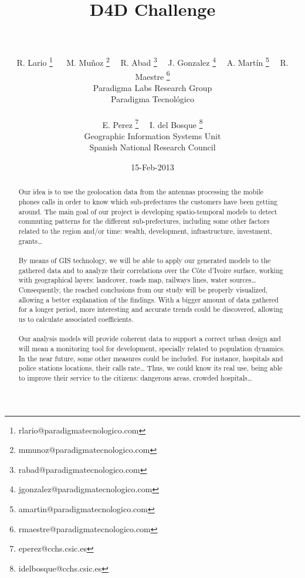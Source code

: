 \documentclass[a4paper,11pt]{article}
\begin{document}
\title{{\huge D4D Challenge} \\  \\ }

\author{{
              R. Lario  \footnote{rlario@paradigmatecnologico.com} \ \  %
				M. Muñoz  \footnote{mmunoz@paradigmatecnologico.com} \ \
				R. Abad  \footnote{rabad@paradigmatecnologico.com}  \ \
				J. Gonzalez  \footnote{jgonzalez@paradigmatecnologico.com}  \ \
				A. Martín  \footnote{amartin@paradigmatecnologico.com}  \ \
				R. Maestre  \footnote{rmaestre@paradigmatecnologico.com} 
				\\\small Paradigma Labs Research Group \\\small Paradigma Tecnológico\\ \\
				E. Perez \footnote{eperez@cchs.csic.es}  \ \
				I. del Bosque  \footnote{idelbosque@cchs.csic.es} 
				\\\small Geographic Information Systems Unit \\\small Spanish National Research Council
				}}

\date{15-Feb-2013}
\maketitle

\begin{abstract} 
Our idea is to use the geolocation data from the antennas processing the mobile phones calls in order to know which sub-prefectures the customers have been getting around. The main goal of our project is developing spatio-temporal models to detect commuting patterns for the different sub-prefectures, including some other factors related to the region and/or time: wealth, development, infrastructure, investment, grants…
\\
\\
By means of GIS technology, we will be able to apply our generated models to the gathered data and to analyze their correlations over the Côte d’Ivoire surface, working with geographical layers: landcover, roads map, railways lines, water sources… Consequently, the reached conclusions from our study will be properly visualized, allowing a better explanation of the findings. With a bigger amount of data gathered for a longer period, more interesting and accurate trends could be discovered, allowing us to calculate associated coefficients.
\\
\\
Our analysis models will provide coherent data to support a correct urban design and will mean a monitoring tool for development, specially related to population dynamics.
In the near future, some other measures could be included. For instance, hospitals and police stations locations, their calls rate… Thus, we could know its real use, being able to improve their service to the citizens: dangerous areas, crowded hospitals…
\end{abstract}
\end{document}

